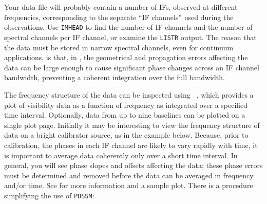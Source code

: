
Your data file will probably contain a number of IFs, observed at
different frequencies, corresponding to the separate ``IF channels''
used during the observations.  Use {\tt IMHEAD} to find the number of
IF channels and the number of spectral channels per IF channel, or
examine the {\tt LISTR} output.  The reason that the data must be
stored in narrow spectral channels, even for continuum applications,
is that, in , the geometrical and propagation errors
affecting the data can be large enough to cause significant phase
changes across an IF channel bandwidth, preventing a coherent
integration over the full bandwidth.

The frequency structure of the data can be inspected using {\tt
{}}, which provides a plot of visibility data as a function
of frequency as integrated over a specified time interval.  Optionally,
data from up to nine baselines can be plotted on a single plot page.
Initially it may be interesting to view the frequency structure of
data on a bright calibrator source, as in the example below.  Because,
prior to calibration, the phases in each IF channel are likely to vary
rapidly with time, it is important to average data coherently only
over a short time interval.  In general, you will see phase slopes and
offsets affecting the data; these phase errors must be determined and
removed before the data can be averaged in frequency and/or time.  See
 for more information and a sample plot.  There is a
procedure simplifying the use of {\tt POSSM}:
\pd

